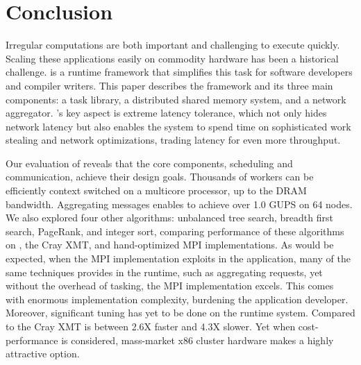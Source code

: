 \section{Conclusion}

Irregular computations are both important and challenging to execute quickly.
Scaling these applications easily on commodity hardware has been a historical
challenge. \Grappa is a runtime framework that simplifies this task for
software developers and compiler writers. This paper describes the \Grappa
framework and its three main components: a task library, a distributed shared
memory system, and a network aggregator. \Grappa's key aspect is extreme latency tolerance,
which not only hides network latency but also enables the system to spend time
on sophisticated work stealing and network optimizations, trading latency for
even more throughput.

Our evaluation of \Grappa reveals that the core components, scheduling and communication, achieve their design goals.  Thousands of workers can be efficiently context switched on a multicore processor, up to the DRAM bandwidth.  Aggregating messages enables \Grappa to achieve over 1.0 GUPS on 64 nodes.  We also explored four other algorithms: unbalanced tree search, breadth first search, PageRank, and integer sort, comparing performance of these algorithms on \Grappa, the Cray XMT, and hand-optimized MPI implementations.  As would be expected, when the MPI implementation exploits in the application, many of the same techniques \Grappa provides in the runtime, such as aggregating requests, yet without the overhead of tasking, the MPI implementation excels.  This comes with enormous implementation complexity, burdening the application developer. Moreover, significant tuning has yet to be done on the \Grappa runtime system.  Compared to the Cray XMT \Grappa is between 2.6X faster and 4.3X slower.  Yet when cost-performance is considered, mass-market x86 cluster hardware makes \Grappa a highly attractive option.
